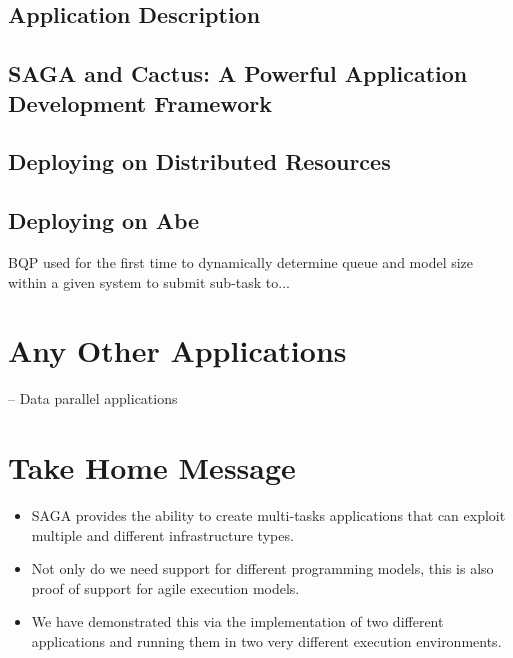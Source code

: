 \documentclass[conference,final]{IEEEtran}
\begin{document}
\subsection{Application Description}

\subsection{SAGA and Cactus: A Powerful Application Development
  Framework}

\subsection{Deploying on Distributed Resources}

\subsection{Deploying on Abe}

BQP used for the first time to dynamically determine queue and model
size within a given system to submit sub-task to...


\section{Any Other Applications}

 -- Data parallel applications

\section{Take Home Message}

\begin{itemize}
\item  SAGA provides the ability to create multi-tasks applications that
  can exploit multiple and different infrastructure types.

\item Not only do we need support for different programming models, 
this is also proof of support for agile execution models.

\item We have demonstrated this via the implementation of two
  different applications and running them in two very different
  execution environments.
\end{itemize}







  
\end{document}
